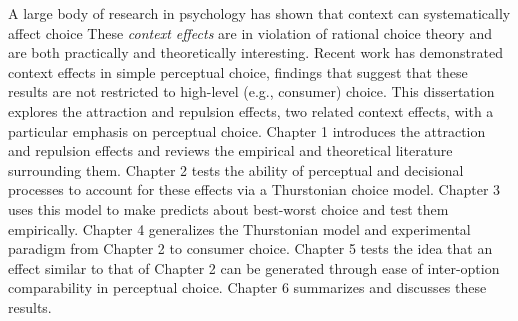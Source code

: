 A large body of research in psychology has shown that context can systematically affect choice These \textit{context effects} are in violation of rational choice theory and are both practically and theoretically interesting. Recent work has demonstrated context effects in simple perceptual choice,  findings that suggest that these results are not restricted to high-level (e.g., consumer) choice. This dissertation explores the attraction and repulsion effects, two related context effects, with a particular emphasis on perceptual choice. Chapter 1 introduces the attraction and repulsion effects and reviews the empirical and theoretical literature surrounding them. Chapter 2 tests the ability of perceptual and decisional processes to account for these effects via a Thurstonian choice model. Chapter 3 uses this model to make predicts about best-worst choice and test them empirically. Chapter 4 generalizes the Thurstonian model and experimental paradigm from Chapter 2 to consumer choice. Chapter 5 tests the idea that an effect similar to that of Chapter 2 can be generated through ease of inter-option comparability in perceptual choice. Chapter 6 summarizes and discusses these results. 